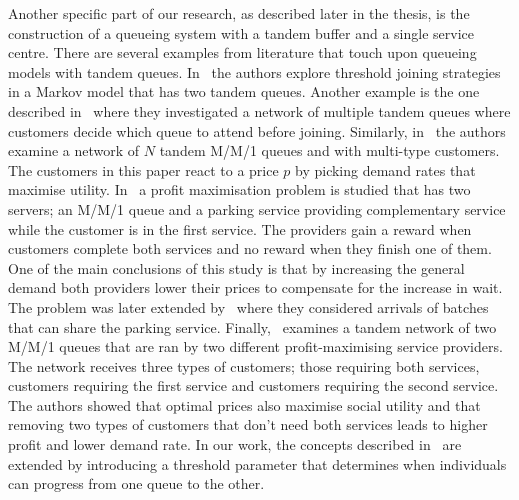 Another specific part of our research, as described later in the thesis, is the 
construction of a queueing system with a tandem buffer and a single service
centre.
There are several examples from literature that touch upon queueing models
with tandem queues.
In~\cite{d2015pure} the authors explore threshold joining strategies in a 
Markov model that has two tandem queues.
Another example is the one described in~\cite{burnetas2013customer}
where they investigated a network of multiple tandem queues where customers 
decide which queue to attend before joining.
Similarly, in~\cite{bacsar2002stackelberg} the authors examine a network of 
\(N\) tandem M/M/1 queues and with multi-type customers. 
The customers in this paper react to a price \(p\) by picking demand rates that 
maximise utility.
In~\cite{veltman2005equilibrium} a profit maximisation problem is studied that
has two servers; an M/M/1 queue and a parking service providing complementary 
service while the customer is in the first service. 
The providers gain a reward when customers complete both services and no reward 
when they finish one of them.
One of the main conclusions of this study is that by increasing the general 
demand both providers lower their prices to compensate for the increase in wait.
The problem was later extended by~\cite{sun2009equilibrium} where they 
considered arrivals of batches that can share the parking service.
Finally,~\cite{afeche2007decentralized} examines a tandem network of two M/M/1 
queues that are ran by two different profit-maximising service providers.
The network receives three types of customers; those requiring both services, 
customers requiring the first service and customers requiring the second
service.
The authors showed that optimal prices also maximise social utility and that
removing two types of customers that don't need both services leads to higher 
profit and lower demand rate.
In our work, the concepts described in~\cite{d2015pure, burnetas2013customer,
bacsar2002stackelberg} are extended by introducing a threshold parameter that 
determines when individuals can progress from one queue to the other.


